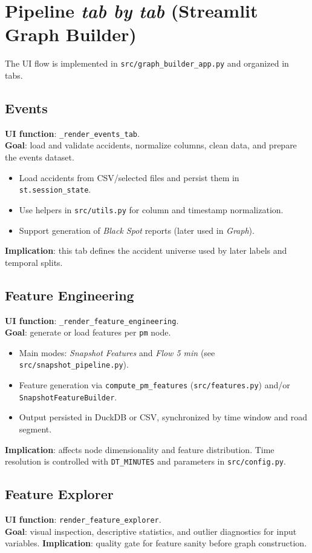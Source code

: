 \section{Pipeline \emph{tab by tab} (Streamlit Graph Builder)}
The UI flow is implemented in \texttt{src/graph\_builder\_app.py} and organized in tabs.

\subsection{Events}
\textbf{UI function}: \texttt{\_render\_events\_tab}.\\
\textbf{Goal}: load and validate accidents, normalize columns, clean data, and prepare the events dataset.
\begin{itemize}[leftmargin=*]
  \item Load accidents from CSV/selected files and persist them in \texttt{st.session\_state}.
  \item Use helpers in \texttt{src/utils.py} for column and timestamp normalization.
  \item Support generation of \emph{Black Spot} reports (later used in \emph{Graph}).
\end{itemize}
\textbf{Implication}: this tab defines the accident universe used by later labels and temporal splits.

\subsection{Feature Engineering}
\textbf{UI function}: \texttt{\_render\_feature\_engineering}.\\
\textbf{Goal}: generate or load features per \texttt{pm} node.
\begin{itemize}[leftmargin=*]
  \item Main modes: \emph{Snapshot Features} and \emph{Flow 5 min} (see \texttt{src/snapshot\_pipeline.py}).
  \item Feature generation via \texttt{compute\_pm\_features} (\texttt{src/features.py}) and/or \texttt{SnapshotFeatureBuilder}.
  \item Output persisted in DuckDB or CSV, synchronized by time window and road segment.
\end{itemize}
\textbf{Implication}: affects node dimensionality and feature distribution. Time resolution is controlled with \texttt{DT\_MINUTES} and parameters in \texttt{src/config.py}.

\subsection{Feature Explorer}
\textbf{UI function}: \texttt{render\_feature\_explorer}.\\
\textbf{Goal}: visual inspection, descriptive statistics, and outlier diagnostics for input variables.
\textbf{Implication}: quality gate for feature sanity before graph construction.

